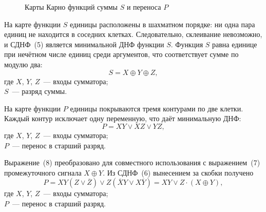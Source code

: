 \documentclass[14pt,a4paper]{extarticle}
\newcommand{\inv}[1]{\overline{#1}}
\begin{document}
\begin{figure}[H]
\centering
{}
\caption{Карты Карно функций суммы $S$ и переноса $P$}
\label{fig:kmap}
\end{figure}

На карте функции $S$ единицы расположены в шахматном порядке: ни одна пара единиц не находится в соседних клетках. Следовательно, склеивание невозможно, и СДНФ~(5) является минимальной ДНФ функции $S$. Функция $S$ равна единице при нечётном числе единиц среди аргументов, что соответствует сумме по модулю два:
\begin{equation}
S = X \oplus Y \oplus Z,
\end{equation}
\noindent где $X$, $Y$, $Z$~--- входы сумматора;\\
$S$~--- разряд суммы.

На карте функции $P$ единицы покрываются тремя контурами по две клетки. Каждый контур исключает одну переменную, что даёт минимальную ДНФ:
\begin{equation}
P = X Y \vee X Z \vee Y Z,
\end{equation}
\noindent где $X$, $Y$, $Z$~--- входы сумматора;\\
$P$~--- перенос в старший разряд.

Выражение~(8) преобразовано для совместного использования с выражением~(7) промежуточного сигнала $X \oplus Y$. Из СДНФ~(6) вынесением за скобки получено
\begin{equation}
P = X Y (Z \vee \inv{Z}) \vee Z (\inv{X} Y \vee X \inv{Y}) = X Y \vee Z \cdot (X \oplus Y),
\end{equation}
\noindent где $X$, $Y$, $Z$~--- входы сумматора;\\
$P$~--- перенос в старший разряд.
\end{document}
